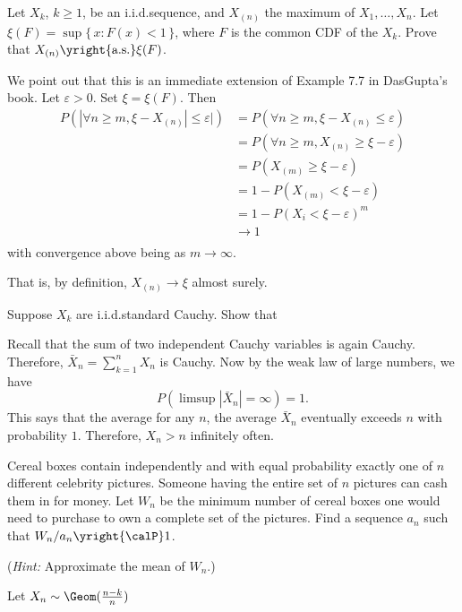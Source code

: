 \begin{problem}
  Let \(X_k\), \(k\geq 1\), be an i.i.d.\@ sequence, and \(X_{(n)}\) the
  maximum of \(X_1,\dotsc,X_n\). Let \(\xi(F)=\sup\{\,x:F(x)<1\,\}\), where
  \(F\) is the common CDF of the \(X_k\). Prove that
  \(X_{(n)}\yright{\text{a.s.}}\xi(F)\).
\end{problem}
\begin{solution}
  We point out that this is an immediate extension of Example 7.7 in
  DasGupta's book. Let $\varepsilon >0$. Set $\xi = \xi(F)$. Then
  \begin{align*}
    P(|\forall n \geq m, \xi - X_{(n)}| \leq \varepsilon|)
    &= P(\forall n \geq m, \xi - X_{(n)} \leq \varepsilon)\\
    &= P(\forall n \geq m, X_{(n)} \geq \xi - \varepsilon )\\
    &= P(X_{(m)} \geq \xi - \varepsilon )\\
    &= 1- P(X_{(m)} < \xi - \varepsilon )\\
    &= 1- P(X_i < \xi - \varepsilon)^m\\
    &\to 1\\
  \end{align*}
  with convergence above being as $m \to \infty$.

  That is, by definition, $X_{(n)} \to \xi$ almost surely.
\end{solution}
\newpage

\begin{problem}[DasGupta 7.14 (a)]
  Suppose \(X_k\) are i.i.d.\@ standard Cauchy. Show that
\end{problem}
\begin{solution}
  Recall that the sum of two independent Cauchy variables is again
  Cauchy. Therefore, \(\bar X_n=\sum_{k=1}^n X_n\) is Cauchy. Now by the
  weak law of large numbers, we have
  \[
    P(\limsup|\bar X_n|=\infty)=1.
  \]
  This says that the average for any \(n\), the average \(\bar X_n\)
  eventually exceeds \(n\) with probability \(1\). Therefore, \(X_n>n\)
  infinitely often.
\end{solution}
\newpage

\begin{problem}
  Cereal boxes contain independently and with equal probability exactly one
  of \(n\) different celebrity pictures. Someone having the entire set of
  \(n\) pictures can cash them in for money. Let \(W_n\) be the minimum
  number of cereal boxes one would need to purchase to own a complete set
  of the pictures. Find a sequence \(a_n\) such that
  \(W_n/a_n\yright{\calP} 1\).

  \noindent (\emph{Hint:} Approximate the mean of \(W_n\).)
\end{problem}
\begin{solution}
  Let \(X_n\sim\Geom(\frac{n-k}{n})\)
\end{solution}
\newpage

